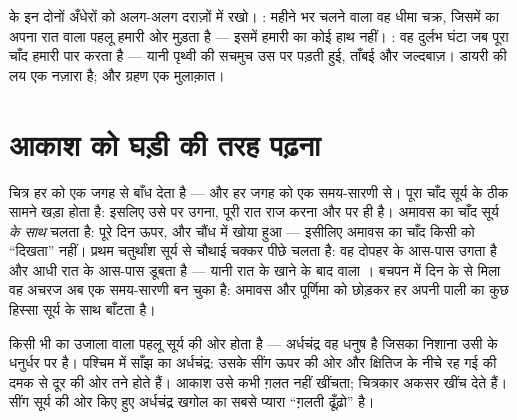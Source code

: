 \begin{example}[ग्रहण बनाम कला]\label{ex:g7:moon-phases:eclipsevs}
 के इन दोनों अँधेरों को अलग-अलग दराज़ों में रखो।
\emph{}: महीने भर चलने वाला वह धीमा चक्र, जिसमें  का अपना
रात वाला पहलू हमारी ओर मुड़ता है --- इसमें हमारी  का कोई हाथ नहीं।
\emph{}: वह दुर्लभ घंटा जब पूरा चाँद हमारी  पार
करता है --- यानी पृथ्वी की  सचमुच उस पर पड़ती हुई, ताँबई और
जल्दबाज़। डायरी की लय एक नज़ारा है; और ग्रहण एक मुलाक़ात।
\end{example}

\section{आकाश को घड़ी की तरह पढ़ना}

\begin{example}\label{ex:g7:moon-phases:hours}
चित्र हर  को एक जगह से बाँध देता है --- और हर जगह को एक समय-सारणी
से। पूरा चाँद सूर्य के ठीक सामने खड़ा होता है: इसलिए उसे  पर
उगना, पूरी रात राज करना और  पर  ही है। अमावस का चाँद
सूर्य \emph{के साथ} चलता है: पूरे दिन ऊपर, और चौंध में खोया हुआ ---
इसीलिए अमावस का चाँद किसी को ``दिखता'' नहीं। प्रथम चतुर्थांश सूर्य से
चौथाई चक्कर पीछे चलता है: वह दोपहर के आस-पास उगता है और आधी रात के
आस-पास डूबता है --- यानी रात के खाने के बाद वाला । बचपन में
दिन के  से मिला वह अचरज अब एक समय-सारणी बन चुका है: अमावस और
पूर्णिमा को छोड़कर हर  अपनी पाली का कुछ हिस्सा सूर्य के साथ
बाँटता है।
\end{example}

\begin{example}[अर्धचंद्र का मुँह किस ओर होता है?]\label{ex:g7:moon-phases:points}
किसी भी  का उजाला वाला पहलू सूर्य की ओर होता है --- अर्धचंद्र वह
धनुष है जिसका निशाना उसी के धनुर्धर पर है। पश्चिम में साँझ का
अर्धचंद्र: उसके सींग ऊपर की ओर और क्षितिज के नीचे रह गई  की
दमक से दूर की ओर तने होते हैं। आकाश उसे कभी ग़लत नहीं खींचता; चित्रकार
अकसर खींच देते हैं। सींग सूर्य की ओर किए हुए अर्धचंद्र खगोल का सबसे
प्यारा ``ग़लती ढूँढ़ो'' है।
\end{example}

